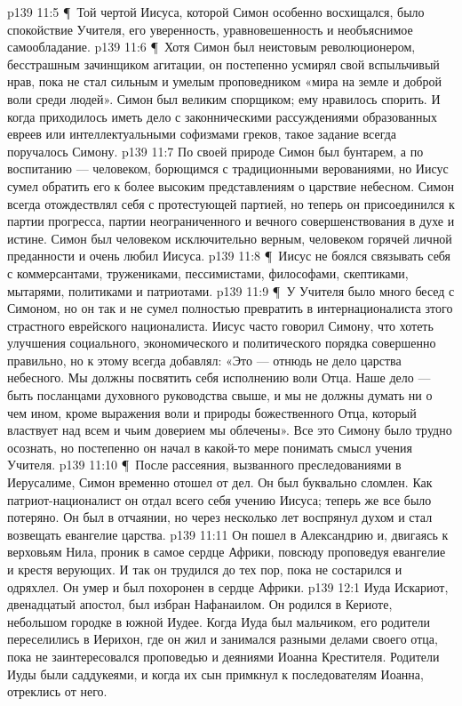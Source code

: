 \vs p139 11:5 \P\ Той чертой Иисуса, которой Симон особенно восхищался, было спокойствие Учителя, его уверенность, уравновешенность и необъяснимое самообладание.
\vs p139 11:6 \P\ Хотя Симон был неистовым революционером, бесстрашным зачинщиком агитации, он постепенно усмирял свой вспыльчивый нрав, пока не стал сильным и умелым проповедником «мира на земле и доброй воли среди людей». Симон был великим спорщиком; ему нравилось спорить. И когда приходилось иметь дело с законническими рассуждениями образованных евреев или интеллектуальными софизмами греков, такое задание всегда поручалось Симону.
\vs p139 11:7 По своей природе Симон был бунтарем, а по воспитанию --- человеком, борющимся с традиционными верованиями, но Иисус сумел обратить его к более высоким представлениям о царствие небесном. Симон всегда отождествлял себя с протестующей партией, но теперь он присоединился к партии прогресса, партии неограниченного и вечного совершенствования в духе и истине. Симон был человеком исключительно верным, человеком горячей личной преданности и очень любил Иисуса.
\vs p139 11:8 \P\ Иисус не боялся связывать себя с коммерсантами, тружениками, пессимистами, философами, скептиками, мытарями, политиками и патриотами.
\vs p139 11:9 \P\ У Учителя было много бесед с Симоном, но он так и не сумел полностью превратить в интернационалиста зтого страстного еврейского националиста. Иисус часто говорил Симону, что хотеть улучшения социального, экономического и политического порядка совершенно правильно, но к этому всегда добавлял: «Это --- отнюдь не дело царства небесного. Мы должны посвятить себя исполнению воли Отца. Наше дело --- быть посланцами духовного руководства свыше, и мы не должны думать ни о чем ином, кроме выражения воли и природы божественного Отца, который властвует над всем и чьим доверием мы облечены». Все это Симону было трудно осознать, но постепенно он начал в какой\hyp{}то мере понимать смысл учения Учителя.
\vs p139 11:10 \P\ После рассеяния, вызванного преследованиями в Иерусалиме, Симон временно отошел от дел. Он был буквально сломлен. Как патриот\hyp{}националист он отдал всего себя учению Иисуса; теперь же все было потеряно. Он был в отчаянии, но через несколько лет воспрянул духом и стал возвещать евангелие царства.
\vs p139 11:11 Он пошел в Александрию и, двигаясь к верховьям Нила, проник в самое сердце Африки, повсюду проповедуя евангелие и крестя верующих. И так он трудился до тех пор, пока не состарился и одряхлел. Он умер и был похоронен в сердце Африки.
\vs p139 12:1 Иуда Искариот, двенадцатый апостол, был избран Нафанаилом. Он родился в Кериоте, небольшом городке в южной Иудее. Когда Иуда был мальчиком, его родители переселились в Иерихон, где он жил и занимался разными делами своего отца, пока не заинтересовался проповедью и деяниями Иоанна Крестителя. Родители Иуды были саддукеями, и когда их сын примкнул к последователям Иоанна, отреклись от него.
